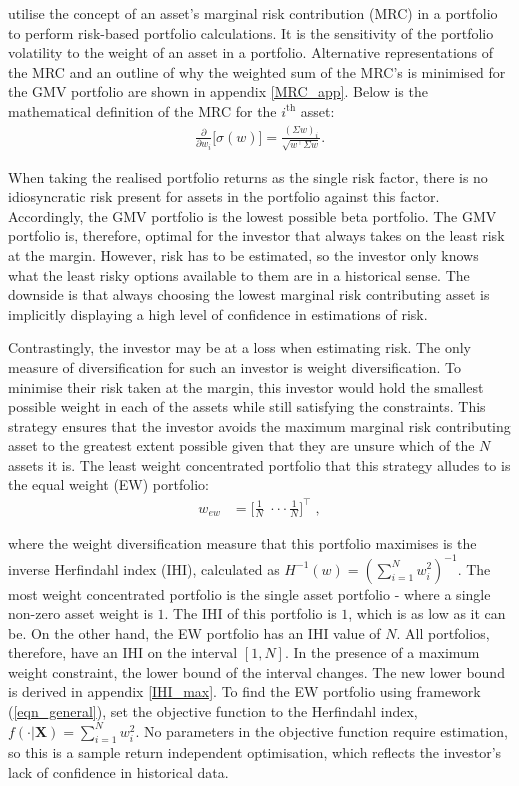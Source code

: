 \documentclass[a4paper,11pt,nocenter,bold,noupper,headcount]{mythesis}
\theoremstyle{plain}
\theoremstyle{definition}
\begin{document}
\cite{MRT10} utilise the concept of an asset's marginal risk contribution (MRC) in a portfolio to perform risk-based portfolio calculations. It is the sensitivity of the portfolio volatility to the weight of an asset in a portfolio. Alternative representations of the MRC and an outline of why the weighted sum of the MRC's is minimised for the GMV portfolio are shown in appendix \ref{MRC_app}. Below is the mathematical definition of the MRC for the $i^{\mathrm{th}}$ asset:
\begin{align}
\frac{\partial}{\partial w_i} \Big [ \sigma(w) \Big ]= \frac{(\Sigma w)_i}{\sqrt{w^\intercal \Sigma w}}.
\end{align}

When taking the realised portfolio returns as the single risk factor, there is no idiosyncratic risk present for assets in the portfolio against this factor. Accordingly, the GMV portfolio is the lowest possible beta portfolio. The GMV portfolio is, therefore, optimal for the investor that always takes on the least risk at the margin. However, risk has to be estimated, so the investor only knows what the least risky options available to them are in a historical sense. The downside is that always choosing the lowest marginal risk contributing asset is implicitly displaying a high level of confidence in estimations of risk.

Contrastingly, the investor may be at a loss when estimating risk. The only measure of diversification for such an investor is weight diversification. To minimise their risk taken at the margin, this investor would hold the smallest possible weight in each of the assets while still satisfying the constraints. This strategy ensures that the investor avoids the maximum marginal risk contributing asset to the greatest extent possible given that they are unsure which of the $N$ assets it is. The least weight concentrated portfolio that this strategy alludes to is the equal weight (EW) portfolio:
\begin{align}
w_{ew} & = \Big [\frac{1}{N} \; \cdot \cdot \cdot \frac{1}{N} \Big ]^\intercal \; ,
\end{align}

where the weight diversification measure that this portfolio maximises is the inverse Herfindahl index (IHI), calculated as $H^{-1} (w) = (\sum_{i = 1}^N w_i^2)^{-1}$. The most weight concentrated portfolio is the single asset portfolio - where a single non-zero asset weight is $1$. The IHI of this portfolio is $1$, which is as low as it can be. On the other hand, the EW portfolio has an IHI value of $N$. All portfolios, therefore, have an IHI on the interval $[1, N]$. In the presence of a maximum weight constraint, the lower bound of the interval changes. The new lower bound is derived in appendix \ref{IHI_max}. To find the EW portfolio using framework (\ref{eqn_general}), set the objective function to the Herfindahl index, $f(\cdot|\textbf{X}) = \sum_{i = 1}^N w_i^2$. No parameters in the objective function require estimation, so this is a sample return independent optimisation, which reflects the investor's lack of confidence in historical data.
\end{document}
